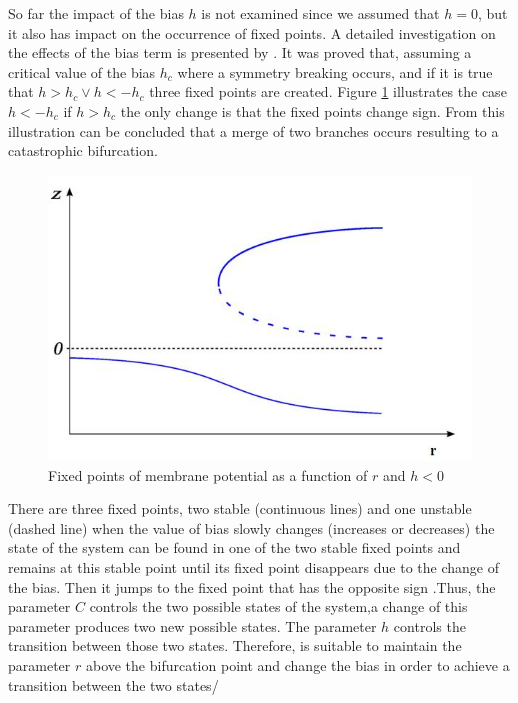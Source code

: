 \documentclass[msc,ai,logo]{infthesis}
\begin{document}
So far the impact of the bias $h$ is not examined since we assumed that $h=0$, but it also has impact on the occurrence of fixed points. A detailed investigation on the effects of the bias term is presented by \cite{hesse09:diss}. It was proved that, assuming a critical value of the bias $h_{c}$ where a symmetry breaking occurs, and if it is true that $h>h_{c} \vee h<-h_{c} $ three fixed points are created. Figure \ref{fig:biffuccat} illustrates the case $ h<-h_{c} $ if 
$h>h_{c}$ the only change is that the fixed points change sign. From this illustration can be concluded that a merge of two branches occurs resulting to a catastrophic bifurcation. 

\begin{figure}[H]
\includegraphics[scale=0.47]{biffcat.jpg}
\centering
\caption{Fixed points of membrane potential as a function of $r$ and $h<0$ \citep{hesse09:diss} }
\label{fig:biffuccat}
\end{figure}

There are three fixed points, two stable (continuous lines) and one unstable (dashed line) when the value of bias slowly changes (increases or decreases) the state of the system can be found in one of the two stable fixed points and remains at this stable point until its fixed point disappears due to the change of the bias. Then it jumps to the fixed point that has the opposite sign \citep{martius:diss10}.Thus, the parameter $C$ controls the two possible states of the system,a change of this parameter produces two new possible states. The parameter $h$ controls the transition between those two states. Therefore, is suitable to maintain the parameter $r$ above the bifurcation point and change the bias in order to achieve a transition between the two states/    
\end{document}
